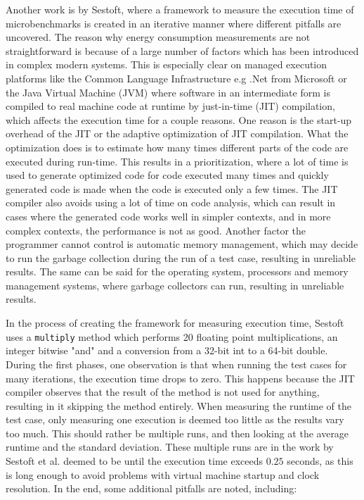 Another work is by Sestoft\cite[]{sestoft2013microbenchmarks}, where a framework to measure the execution time of microbenchmarks is created in an iterative manner where different pitfalls are uncovered. The reason why energy consumption measurements are not straightforward is because of a large number of factors which has been introduced in complex modern systems. This is especially clear on managed execution platforms like the Common Language Infrastructure e.g .Net from Microsoft or the Java Virtual Machine (JVM) where software in an intermediate form is compiled to real machine code at runtime by just-in-time (JIT) compilation, which affects the execution time for a couple reasons. One reason is the start-up overhead of the JIT or the adaptive optimization of JIT compilation. What the optimization does is to estimate how many times different parts of the code are executed during run-time. This results in a prioritization, where a lot of time is used to generate optimized code for code executed many times and quickly generated code is made when the code is executed only a few times. The JIT compiler also avoids using a lot of time on code analysis, which can result in cases where the generated code works well in simpler contexts, and in more complex contexts, the performance is not as good. Another factor the programmer cannot control is automatic memory management, which may decide to run the garbage collection during the run of a test case, resulting in unreliable results. The same can be said for the operating system, processors and memory management systems, where garbage collectors can run, resulting in unreliable results.\newline

In the process of creating the framework for measuring execution time, Sestoft\cite[]{sestoft2013microbenchmarks} uses a \texttt{multiply} method which performs 20 floating point multiplications, an integer bitwise "and" and a conversion from a 32-bit int to a 64-bit double. During the first phases, one observation is that when running the test cases for many iterations, the execution time drops to zero. This happens because the JIT compiler observes that the result of the method is not used for anything, resulting in it skipping the method entirely. When measuring the runtime of the test case, only measuring one execution is deemed too little as the results vary too much. This should rather be multiple runs, and then looking at the average runtime and the standard deviation. These multiple runs are in the work by Sestoft et al.\cite{sestoft2013microbenchmarks} deemed to be until the execution time exceeds $0.25$ seconds, as this is long enough to avoid problems with virtual machine startup and clock resolution. In the end, some additional pitfalls are noted, including:\cite{sestoft2013microbenchmarks}

